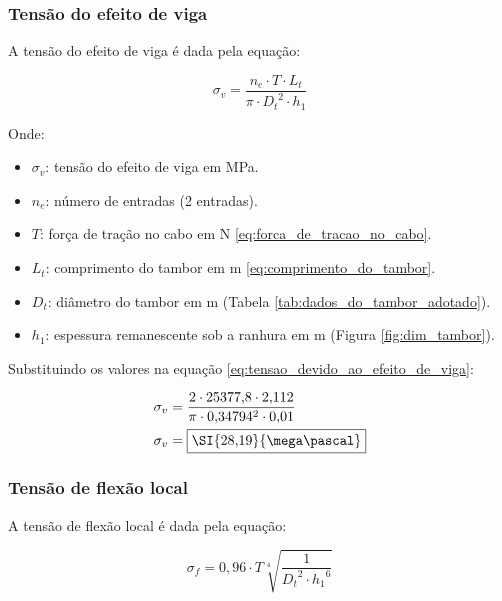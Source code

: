 \subsubsection{Tensão do efeito de viga}

A tensão do efeito de viga é dada pela equação:

\begin{equation}
  \sigma_v = \frac{n_e \cdot T \cdot L_t}{\pi \cdot {D_t}^2 \cdot h_1}
  \label{eq:tensao_devido_ao_efeito_de_viga}
\end{equation}

Onde:

\begin{itemize}
  \item $\sigma_v$: tensão do efeito de viga em \si{\mega\pascal}.
  \item $n_e$: número de entradas (2 entradas).
  \item $T$: força de tração no cabo em \si{\newton} \eqref{eq:forca_de_tracao_no_cabo}.
  \item $L_t$: comprimento do tambor em \si{\meter} \eqref{eq:comprimento_do_tambor}.
  \item $D_t$: diâmetro do tambor em \si{\meter} (Tabela \ref{tab:dados_do_tambor_adotado}).
  \item $h_1$: espessura remanescente sob a ranhura em \si{\meter} (Figura \ref{fig:dim_tambor}).
\end{itemize}

\vspace{1em}

Substituindo os valores na equação \eqref{eq:tensao_devido_ao_efeito_de_viga}:

\begin{align*}
  \sigma_v & = \frac{2 \cdot 25377{,}8 \cdot 2{,}112}{\pi \cdot 0{,}34794^2 \cdot 0{,}01} \\
  \sigma_v & = \boxed{\SI{28{,}19}{\mega\pascal}}
\end{align*}

\subsubsection{Tensão de flexão local}

A tensão de flexão local é dada pela equação:

\begin{equation}
  \sigma_f = 0{,}96 \cdot T \sqrt[4]{\frac{1}{{D_t}^2 \cdot {h_1}^6}}
  \label{eq:tensao_de_flexao_local}
\end{equation}

